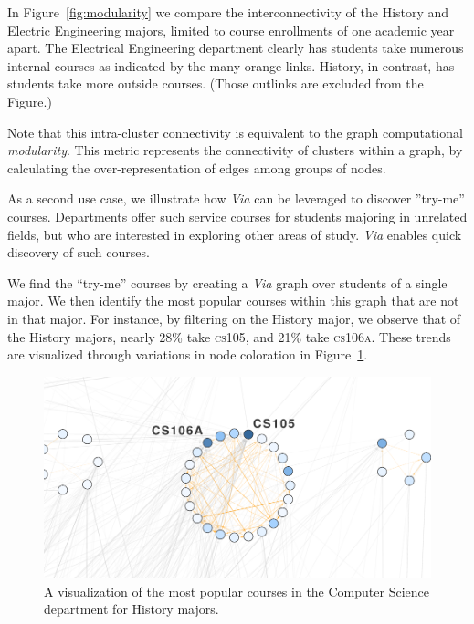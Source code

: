 In Figure~\ref{fig:modularity} we compare the interconnectivity of
the History and Electric Engineering majors, limited to course
enrollments of one academic year apart. The Electrical Engineering
department clearly has students take numerous internal courses as
indicated by the many orange links. History, in contrast, has students
take more outside courses. (Those outlinks are excluded from the
Figure.)

Note that this intra-cluster connectivity is equivalent to the graph
computational {\em modularity}. This metric represents the connectivity
of clusters within a graph, by calculating the over-representation of
edges among groups of nodes.

As a second use case, we illustrate how \textit{Via} can be leveraged
to discover ''try-me'' courses. Departments offer such service courses
for students majoring in unrelated fields, but who are interested in
exploring other areas of study. {\em Via} enables quick discovery of
such courses.

We find the ``try-me'' courses by creating a {\em Via} graph over
students of a single major. We then identify the most popular courses
within this graph that are not in that major. For instance,
by filtering on the History major, we observe that of the History
majors, nearly 28\% take \textsc{cs105}, and 21\% take
\textsc{cs106a}. These trends are visualized through variations in
node coloration in Figure~\ref{fig:history-try-me}.

\begin{figure}[h]
    \centering
    \includegraphics[width=.9\columnwidth]{Figs/final-history-try-me.pdf}
    \caption{A visualization of the most popular courses in the Computer Science department for History majors.}
    \label{fig:history-try-me}
\end{figure}


